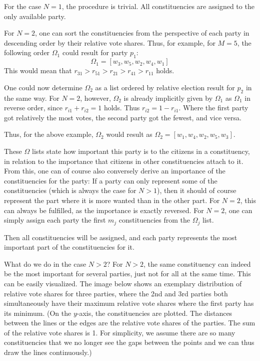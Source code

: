 For the case $N = 1$, the procedure is trivial. All constituencies are assigned to the only available
party.

For $N = 2$, one can sort the constituencies from the perspective of each party in descending order by their relative
vote shares. Thus, for example, for $M = 5$, the following order $\Omega_1$ could result for party $p_1$:
\[
  \Omega_1 = [w_3, w_5, w_2, w_4, w_1]
\]
This would mean that $r_{31} > r_{51} > r_{21} > r_{41} > r_{11}$ holds.

One could now determine $\Omega_2$ as a list ordered by relative election result for $p_2$ in the same way.
For $N = 2$, however, $\Omega_2$ is already implicitly given by $\Omega_1$ as $\Omega_1$ in
reverse order, since $r_{i1} + r_{i2} = 1$ holds. Thus $r_{i2} = 1 - r_{i1}$. Where
the first party got relatively the most votes, the second party got the fewest,
and vice versa.

Thus, for the above example, $\Omega_2$ would result as $\Omega_2 = [w_1, w_4, w_2, w_5, w_3]$.

These $\Omega$ lists state how important this party is to the citizens in a constituency, in
relation to the importance that citizens in other constituencies attach to it. From this, one can of course also
conversely derive an importance of the constituencies for the party: If a party
can only represent some of the constituencies (which is always the case for $N > 1$), then it should
of course represent the part where it is more wanted than in the other part. For
$N = 2$, this can always be fulfilled, as the importance is exactly reversed. For
$N = 2$, one can simply assign each party the first $m_j$ constituencies from the $\Omega_j$ list.

Then all constituencies will be assigned, and each party represents the most important
part of the constituencies for it.

What do we do in the case $N > 2$? For $N > 2$, the same constituency can indeed be the most important for several
parties, just not for all at the same time. This can be easily visualized. The
image below shows an exemplary distribution of relative vote shares for three
parties, where the 2nd and 3rd parties both simultaneously have their maximum relative
vote shares where the first party has its minimum. (On the $y$-axis, the constituencies are
plotted. The distances between the lines or the edges are the relative vote shares
of the parties. The sum of the relative vote shares is 1. For simplicity, we assume
there are so many constituencies that we no longer see the gaps between the points and we can
thus draw the lines continuously.)

